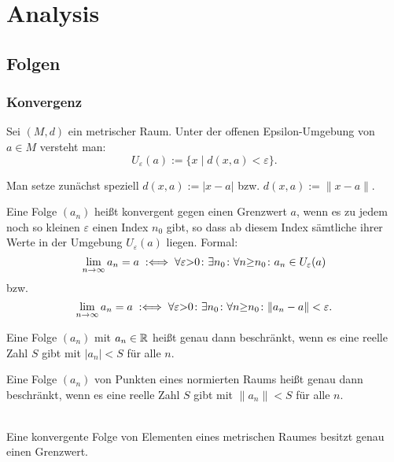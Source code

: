 
\chapter{Analysis}
\section{Folgen}
\subsection{Konvergenz}

\begin{Definition}%
Sei $(M,d)$ ein metrischer Raum. Unter der offenen Epsilon-Umgebung
von $a\in M$ versteht man:%
\[U_\varepsilon(a) := \{x\mid d(x,a)<\varepsilon\}.\]
\end{Definition}

\noindent
Man setze zunächst speziell $d(x,a):=|x-a|$ bzw. $d(x,a):=\|x-a\|$.

\begin{Definition}%
\label{def:lim}
Eine Folge $(a_n)$ heißt konvergent gegen einen Grenzwert $a$, wenn es
zu jedem noch so kleinen $\varepsilon$ einen Index $n_0$ gibt, so dass
ab diesem Index sämtliche ihrer Werte in der Umgebung
$U_\varepsilon(a)$ liegen. Formal:
\[\lim_{n\to\infty} a_n = a
\;:\Longleftrightarrow\; \forall\varepsilon{>}0\colon\exists n_0\colon\forall n{\ge}n_0\colon a_n\in U_\varepsilon(a)\]
bzw.
\[\lim_{n\to\infty} a_n = a
\;:\Longleftrightarrow\; \forall\varepsilon{>}0\colon\exists n_0\colon\forall n{\ge}n_0\colon \|a_n-a\|<\varepsilon.\]
\end{Definition}

\begin{Definition}%
\label{def:bseq}
Eine Folge $(a_n)$ mit $a_n\in\mathbb R$ heißt genau dann beschränkt,
wenn es eine reelle Zahl $S$ gibt mit $|a_n|<S$ für alle $n$.

Eine Folge $(a_n)$ von Punkten eines normierten Raums heißt genau
dann beschränkt, wenn es eine reelle Zahl $S$ gibt mit $\|a_n\|<S$
für alle $n$.
\end{Definition}

\begin{Satz}\mbox{}\\
Eine konvergente Folge von Elementen eines metrischen Raumes
besitzt genau einen Grenzwert.
\end{Satz}

